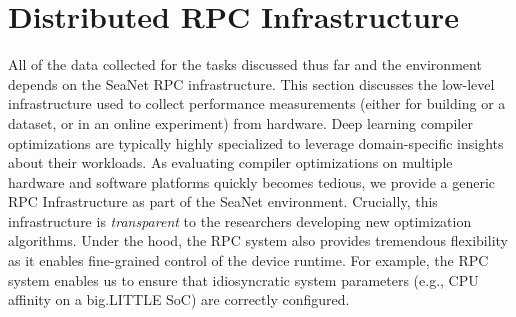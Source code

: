 \section{Distributed RPC Infrastructure}
\label{sec:rpc}
All of the data collected for the tasks discussed thus far and the environment depends on the SeaNet RPC infrastructure.
This section discusses the low-level infrastructure used to collect performance measurements (either for building or a dataset, or in an online experiment) from hardware.
Deep learning compiler optimizations are typically highly specialized to leverage domain-specific insights about their workloads.
As evaluating compiler optimizations on multiple hardware and software platforms quickly becomes tedious, we provide a generic RPC Infrastructure as part of the SeaNet environment.
Crucially, this infrastructure is \emph{transparent} to the researchers developing new optimization algorithms.
Under the hood, the RPC system also provides tremendous flexibility as it enables fine-grained control of the device runtime.
For example, the RPC system enables us to ensure that idiosyncratic system parameters (e.g., CPU affinity on a big.LITTLE SoC) are correctly configured.

